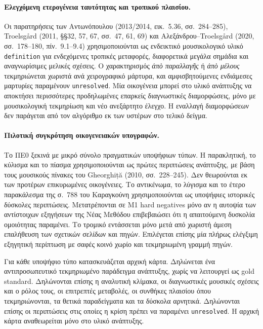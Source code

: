 \documentclass[11pt,a4paper]{article}
\begin{document}
\paragraph{Ελεγχόμενη ετερογένεια ταυτότητας και τροπικού πλαισίου.} Οι παρατηρήσεις των Αντωνόπουλου (2013/2014, εικ.~5.36, σσ.~284--285), Troelsgård (2011, §§32, 57, 67, σσ.~47, 61, 69) και Αλεξάνδρου--Troelsgård (2020, σσ.~178--180, πίν.~9.1--9.4) χρησιμοποιούνται ως ενδεικτικό μουσικολογικό υλικό \texttt{definition} για ενδεχόμενες τροπικές μεταφορές, διαφορετικά μεγάλα σημάδια και αναγνωρίσιμες μελικές σχέσεις. Ο χαρακτηρισμός \emph{ἀπὸ παραλλαγῆς} ή \emph{ἀπὸ μέλους} τεκμηριώνεται χωριστά ανά χειρογραφικό μάρτυρα, και αμφισβητούμενες ενδιάμεσες μαρτυρίες παραμένουν \texttt{unresolved}. Μία οικογένεια μπορεί στο υλικό ανάπτυξης να αποκτήσει περισσότερες προδηλωμένες επαρκείς διαγνωστικές διαμορφώσεις, μόνο με μουσικολογική τεκμηρίωση και νέο ανεξάρτητο έλεγχο. Η εναλλαγή διαμορφώσεων δεν παράγεται από τον αλγόριθμο εκ των υστέρων στο τελικό δείγμα.

\paragraph{Πιλοτική συγκρότηση οικογενειακών υπογραφών.}
Το ΠΕ0 ξεκινά με μικρό σύνολο πραγματικών υποψήφιων τύπων. Η παρακλητική, το κύλισμα και το πίασμα χρησιμοποιούνται ως πρώτες περιπτώσεις ανάπτυξης, με βάση τους μουσικούς πίνακες του Gheorghiță (2010, σσ.~228--245). Δεν θεωρούνται εκ των προτέρων επικυρωμένες οικογένειες. Το αντικένωμα, το λύγισμα και το έτερο παρακάλεσμα της σ.~788 του Καραγκούνη χρησιμοποιούνται ως υποψήφιες ιστορικές δύσκολες περιπτώσεις. Μετατρέπονται σε M1 hard negatives μόνο αν η αυτοψία των αντίστοιχων εξηγήσεων της Νέας Μεθόδου επιβεβαιώσει ότι η απαιτούμενη δυσκολία ομοιότητας παραμένει. Το τρομικό εντάσσεται μόνο μετά από χωριστή άμεση επαλήθευση των σχετικών σελίδων και πηγών. Επιλέγεται επίσης μία πλήρως ελέγξιμη εξηγητική περίπτωση με σαφές κοινό χωρίο και τεκμηριωμένη γραμμή πηγών.

Για κάθε υποψήφιο τύπο κατασκευάζεται αρχική κάρτα. Δηλώνεται ένα αντιπροσωπευτικό τεκμηριωμένο παράδειγμα ανάπτυξης, χωρίς να λειτουργεί ως gold standard. Δηλώνονται επίσης η αναλυτική κλίμακα, οι διαγνωστικές μουσικές σχέσεις και ο ρόλος τους, οι επιτρεπτές μεταβολές, οι συνθήκες πλαισίου όπου τεκμηριώνονται, τα θετικά παραδείγματα και τα δύσκολα αρνητικά. Δηλώνονται επίσης οι περιπτώσεις στις οποίες η κρίση πρέπει να παραμένει \texttt{unresolved}. Η αρχική κάρτα αναθεωρείται μόνο στο υλικό ανάπτυξης.
\end{document}
